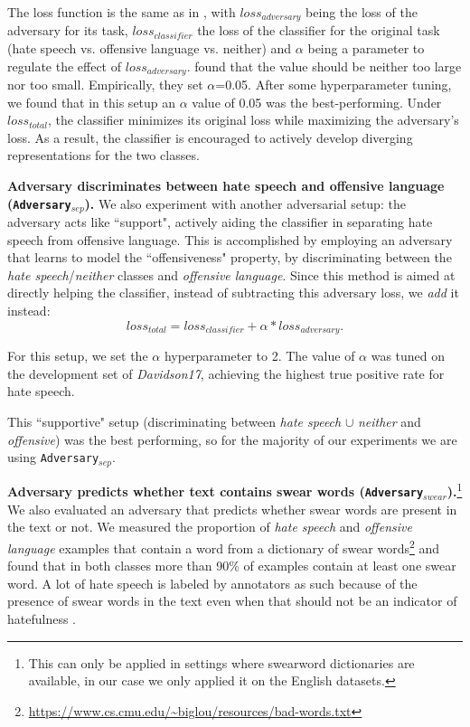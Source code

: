 \documentclass[11pt]{article}
\begin{document}
	The loss function is the same as in \citet{wadsworth2018achieving,adversarial_training_aae_hatespeech}, with $loss_{adversary}$ being the loss of the adversary for its task, $loss_{classifier}$ the loss of the classifier for the original task (hate speech vs. offensive language vs. neither) and $\alpha$ being a parameter to regulate the effect of $loss_{adversary}$. \citet{adversarial_training_aae_hatespeech} found that the value should be neither too large nor too small. Empirically, they set $\alpha$=0.05. After some hyperparameter tuning, we found that in this setup an $\alpha$ value of 0.05 was the best-performing.
	Under $loss_{total}$, the classifier minimizes its original loss while maximizing the adversary's loss. As a result, the classifier is encouraged to actively develop diverging representations for the two classes.
	
	\textbf{Adversary discriminates between hate speech and offensive language (\texttt{Adversary$_{sep}$}).} We also experiment with another adversarial setup: the adversary acts like ``support", actively aiding the classifier in separating hate speech from offensive language. This is accomplished by employing an adversary that learns to model the ``offensiveness" property, by discriminating between the \textit{hate speech}/\textit{neither} classes and \textit{offensive language}. Since this method is aimed at directly helping the classifier, instead of subtracting this adversary loss, we \textit{add} it instead:
	$$loss_{total}=loss_{classifier}+\alpha*loss_{adversary}.$$
	
	For this setup, we set the $\alpha$ hyperparameter to 2. The value of $\alpha$ was tuned on the development set of \textit{Davidson17}, achieving the highest true positive rate for hate speech.
	
	This ``supportive" setup (discriminating between \textit{hate speech} $\cup$ \textit{neither} and \textit{offensive}) was the best performing, so for the majority of our experiments we are using \texttt{Adversary$_{sep}$}.
	
	\textbf{Adversary predicts whether text contains swear words (\texttt{Adversary$_{swear}$}).}\footnote{This can only be applied in settings where swearword dictionaries are available, in our case we only applied it on the English datasets.} We also evaluated an adversary that predicts whether swear words are present in the text or not. We measured the proportion of \textit{hate speech} and \textit{offensive language} examples that contain a word from a dictionary of swear words\footnote{\url{https://www.cs.cmu.edu/~biglou/resources/bad-words.txt}} and found that in both classes more than 90\% of examples contain at least one swear word. A lot of hate speech is labeled by annotators as such because of the presence of swear words in the text even when that should not be an indicator of hatefulness \cite{aae_bias_hatespeech}.
	
\end{document}
